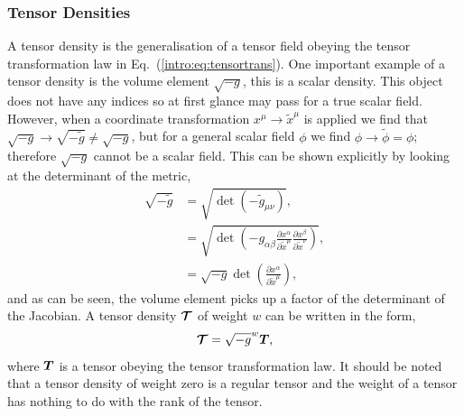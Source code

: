 \subsubsection{Tensor Densities}
A tensor density is the generalisation of a tensor field obeying the tensor transformation law in Eq.~(\ref{intro:eq:tensortrans}). One important example of a tensor density is the volume element $\sqrt{-g}$, this is a scalar density. This object does not have any indices so at first glance may pass for a true scalar field. However, when a coordinate transformation $x^\mu \rightarrow \tilde{x}^\mu$ is applied we find that $\sqrt{-g} \rightarrow \sqrt{-\tilde{g}} \neq \sqrt{-g}$, but for a general scalar field $\phi$ we find $\phi \rightarrow \tilde{\phi} = \phi$; therefore $\sqrt{-g}$ cannot be a scalar field. This can be shown explicitly by looking at the determinant of the metric,
\begin{align}
\sqrt{-\tilde{g}} &= \sqrt{\det(-\tilde{g}_{\mu\nu})},\\
&= \sqrt{\det\left(-g_{\alpha \beta} \frac{\partial x^\alpha}{\partial \tilde{x}^\mu}  \frac{\partial x^\beta}{\partial \tilde{x}^\nu} \right)} ,\\
&= \sqrt{-g} \det\left(\frac{\partial x^\alpha}{\partial \tilde{x}^\mu}\right)\label{intro:eq:rootgtrans},
\end{align}
and as can be seen, the volume element picks up a factor of the determinant of the Jacobian. A tensor density $\boldsymbol{\mathcal{T}}$ of weight $w$ can be written in the form, 
\begin{equation}\boldsymbol{\mathcal{T}} = \sqrt{-g}^w\boldsymbol{T},\end{equation}
 where $\boldsymbol{T}$ is a tensor obeying the tensor transformation law. It should be noted that a tensor density of weight zero is a regular tensor and the weight of a tensor has nothing to do with the rank of the tensor.



